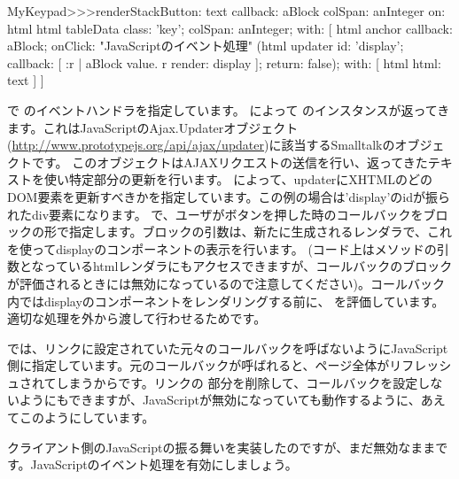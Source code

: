 \documentclass[a4paper,10pt,twoside]{book}
\begin{document}
\begin{code}{}
MyKeypad>>>renderStackButton: text callback: aBlock colSpan: anInteger on: html 
	html tableData
		class: 'key';
		colSpan: anInteger;
		with: [
			html anchor
				callback: aBlock;
				onClick:				"JavaScriptのイベント処理"
					(html updater
						id: 'display';
						callback: [ :r |
							aBlock value.
							r render: display ];
						return: false);
				with: [ html html: text ] ]
\end{code}

で のイベントハンドラを指定しています。
 によって のインスタンスが返ってきます。これはJavaScriptのAjax.Updaterオブジェクト(\url{http://www.prototypejs.org/api/ajax/updater})に該当するSmalltalkのオブジェクトです。
このオブジェクトはAJAXリクエストの送信を行い、返ってきたテキストを使い特定部分の更新を行います。
 によって、updaterにXHTMLのどのDOM要素を更新すべきかを指定しています。この例の場合は'display'のidが振られたdiv要素になります。
 で、ユーザがボタンを押した時のコールバックをブロックの形で指定します。ブロックの引数は、新たに生成されるレンダラで、これを使ってdisplayのコンポーネントの表示を行います。
(コード上はメソッドの引数となっているhtmlレンダラにもアクセスできますが、コールバックのブロックが評価されるときには無効になっているので注意してください)。コールバック内ではdisplayのコンポーネントをレンダリングする前に、  を評価しています。適切な処理を外から渡して行わせるためです。

 では、リンクに設定されていた元々のコールバックを呼ばないようにJavaScript側に指定しています。元のコールバックが呼ばれると、ページ全体がリフレッシュされてしまうからです。リンクの 部分を削除して、コールバックを設定しないようにもできますが、JavaScriptが無効になっていても動作するように、あえてこのようにしています。


クライアント側のJavaScriptの振る舞いを実装したのですが、まだ無効なままです。JavaScriptのイベント処理を有効にしましょう。


\end{document}
